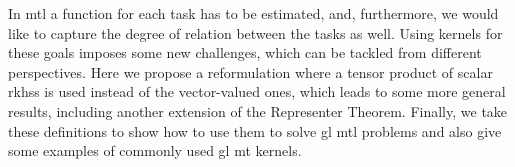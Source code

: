 In \acrshort{mtl} a function for each task has to be estimated, and, furthermore, we would like to capture the degree of relation between the tasks as well. Using kernels for these goals imposes some new challenges, which can be tackled from different perspectives.
%
Here we propose a reformulation where a tensor product of scalar \acrshort{rkhss} is used instead of the vector-valued ones, which leads to some more general results, including another extension of the Representer Theorem.
%
Finally, we take these definitions to show how to use them to solve \acrshort{gl} \acrshort{mtl} problems and also give some examples of commonly used \acrshort{gl} \acrshort{mt} kernels.




